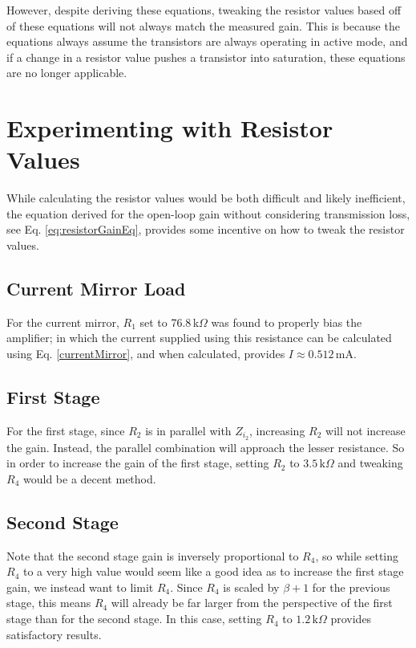 \documentclass[lettersize,journal]{IEEEtran}
\begin{document}
However, despite deriving these equations, tweaking the resistor values based off 
of these equations will not always match the measured gain. This is because the 
equations always assume the transistors are always operating in active mode, and 
if a change in a resistor value pushes a transistor into saturation, these 
equations are no longer applicable.

\section{Experimenting with Resistor Values}
While calculating the resistor values would be both difficult and 
likely inefficient, the equation derived for the open-loop gain without 
considering transmission loss, see Eq. \eqref{eq:resistorGainEq}, 
provides some incentive on how to tweak the resistor values.

\subsection{Current Mirror Load}
For the current mirror, $R_1$ set to 76.8$\,$k$\Omega$ was found to 
properly bias the amplifier; in which the current supplied using 
this resistance can be calculated using Eq. \eqref{currentMirror}, 
and when calculated, provides $I \approx 0.512\,$mA.

\subsection{First Stage}
For the first stage, since $R_2$ is in parallel with $Z_{i_2}$, 
increasing $R_2$ will not increase the gain. Instead, the parallel 
combination will approach the lesser resistance. So in order to 
increase the gain of the first stage, setting $R_2$ to $3.5\,\text{k}\Omega$ 
and tweaking $R_4$ would be a decent method.

\subsection{Second Stage}
Note that the second stage gain is inversely proportional to $R_4$, so 
while setting $R_4$ to a very high value would seem like a good 
idea as to increase the first stage gain, we instead want to 
limit $R_4$. Since $R_4$ is scaled by $\beta+1$ for the previous stage, 
this means $R_4$ will already be far larger from the perspective of the 
first stage than for the second stage. In this case, setting $R_4$ to 
$1.2\,\text{k}\Omega$ provides satisfactory results.
\end{document}
